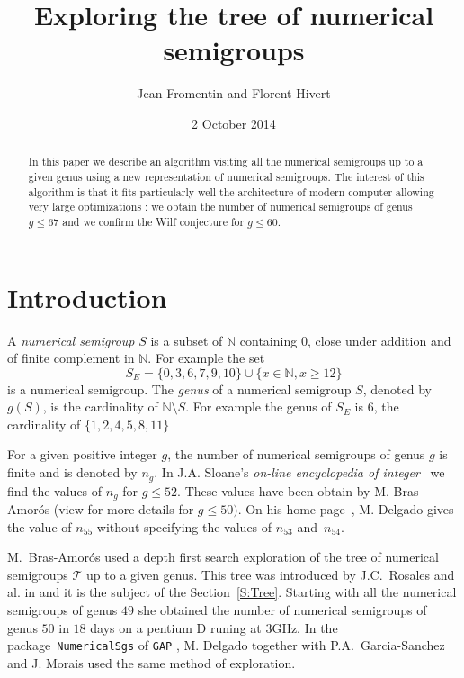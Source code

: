 \documentclass[reqno,11pt]{amsart}
\title{Exploring the tree of numerical semigroups}
\author{Jean Fromentin and  Florent Hivert}
\date{2 October 2014}
\theoremstyle{plain}
\theoremstyle{definition}
\renewcommand{\leq}{\leqslant}
\renewcommand{\geq}{\geqslant}
\newcommand{\NN}{\mathbb{N}}
\renewcommand{\tt}[1]{\texttt{#1}}
\begin{document}
\begin{abstract}
  In this paper we describe an algorithm visiting all the numerical semigroups
  up to a given genus using a new representation of numerical semigroups. The
  interest of this algorithm is that it fits particularly well the
  architecture of modern computer allowing very large optimizations : we obtain the number of numerical semigroups of genus $g\leq  67$ and we confirm the Wilf conjecture for $g\leq 60$.
  
\end{abstract}

\maketitle

\section*{Introduction}

A \emph{numerical semigroup} $S$ is a subset of $\NN$ containing $0$, close under addition and of finite complement in $\NN$.  
For example the set 
\begin{equation}
\label{E:NSG}
S_E=\{0,3,6,7,9,10\}\cup\{x\in\NN, x\geq 12\}
\end{equation}
is a numerical semigroup.
The \emph{genus} of a numerical semigroup $S$, denoted by~$g(S)$, is the cardinality of $\NN\setminus S$.
 For example the genus of $S_E$ is $6$,  the cardinality of $\{1,2,4,5,8,11\}$

For a given positive integer $g$, the number of numerical semigroups of genus $g$ is finite and is denoted by $n_g$. 
In  J.A. Sloane's \emph{on-line encyclopedia of integer}~\cite{OEIS} we find the values of $n_g$ for $g\leq 52$. 
These values have been obtain by M. Bras-Amor\'os (view \cite{BrasAmoros2008} for more details for $g\leq 50)$. 
On his home page~\cite{Delgado}, M. Delgado  gives the value of $n_{55}$ without specifying the values of $n_{53}$ and~$n_{54}$. 

M.~Bras-Amor\'os used a depth first search exploration of the tree of numerical semigroups $\mathcal{T}$ up to a given genus.
This tree was introduced by J.C.~Rosales and al. in \cite{Rosales} and it is the subject of the Section~\ref{S:Tree}.
Starting with all the numerical semigroups of genus $49$ she obtained the number of numerical semigroups of genus $50$ in $18$ days on a pentium D runing at $3$GHz. 
In the package~\tt{NumericalSgs} \cite{NumericalSgps} of \tt{GAP} \cite{GAP}, M. Delgado together with P.A.~Garcia-Sanchez and J. Morais used the same method of exploration.
\end{document}
